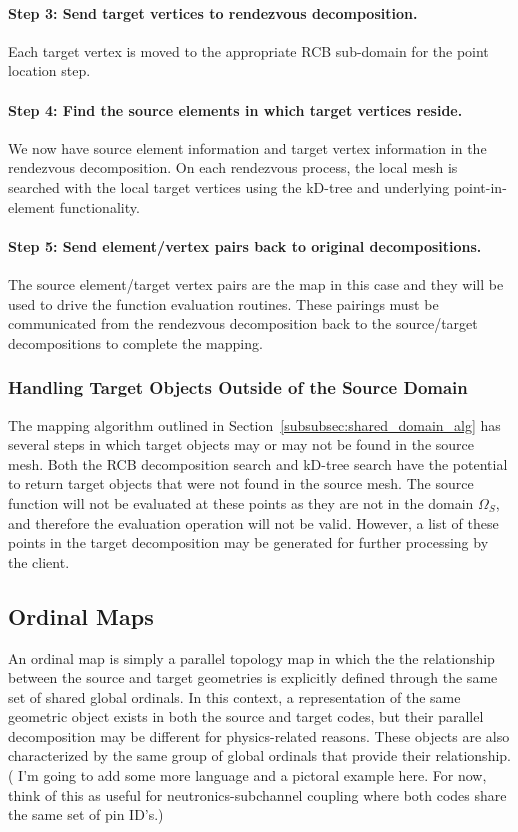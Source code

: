\documentclass[letterpaper,12pt]{article}
\begin{document}
\paragraph{Step 3: Send target vertices to rendezvous decomposition.}
Each target vertex is moved to the appropriate RCB sub-domain for the
point location step.

\paragraph{Step 4: Find the source elements in which target vertices reside.}
We now have source element information and target vertex information
in the rendezvous decomposition. On each rendezvous process, the local
mesh is searched with the local target vertices using the kD-tree and
underlying point-in-element functionality.

\paragraph{Step 5: Send element/vertex pairs back to original
  decompositions.}  The source element/target vertex pairs are the map
in this case and they will be used to drive the function evaluation
routines. These pairings must be communicated from the rendezvous
decomposition back to the source/target decompositions to complete the
mapping.

\subsubsection{Handling Target Objects Outside of the Source Domain}
\label{subsubsec:shared_domain_missed_points}
The mapping algorithm outlined in
Section~\ref{subsubsec:shared_domain_alg} has several steps in which
target objects may or may not be found in the source mesh. Both the
RCB decomposition search and kD-tree search have the potential to
return target objects that were not found in the source mesh. The
source function will not be evaluated at these points as they are not
in the domain $\Omega_S$, and therefore the evaluation operation will
not be valid. However, a list of these points in the target
decomposition may be generated for further processing by the client.

\subsection{Ordinal Maps}\label{subsec:ordinal_maps}
An ordinal map is simply a parallel topology map in which the the
relationship between the source and target geometries is explicitly
defined through the same set of shared global ordinals. In this
context, a representation of the same geometric object exists in both
the source and target codes, but their parallel decomposition may be
different for physics-related reasons. These objects are also
characterized by the same group of global ordinals that provide their
relationship. ( I'm going to add some more language and a pictoral
example here. For now, think of this as useful for
neutronics-subchannel coupling where both codes share the same set of
pin ID's.)
\end{document}
